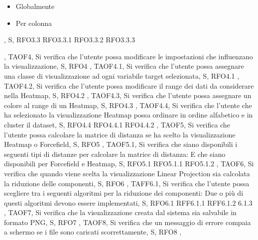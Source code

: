 {{{\begin{itemize}
                \item Globalmente
                \item Per colonna
            \end{itemize}},
            S,
            RFO3.3 RFO3.3.1 RFO3.3.2 RFO3.3.3
        },
        {   
            TAOF4,
            Si verifica che l'utente possa modificare le impostazioni che influenzano la visualizzazione,
            S,
            RFO4
        },
        {   
            TAOF4.1,
            Si verifica che l'utente possa assegnare una classe di visualizzazione ad ogni variabile target selezionata,
            S,
            RFO4.1
        },
        {   
            TAOF4.2,
            Si verifica che l'utente possa modificare il range dei dati da considerare nella Heatmap,
            S,
            RFO4.2
        },
        {   
            TAOF4.3,
            Si verifica che l'utente possa assegnare un colore al range di un Heatmap,
            S,
            RFO4.3
        },
        {   
            TAOF4.4,
            Si verifica che l'utente che ha selezionato la visualizzazione Heatmap possa ordinare in ordine alfabetico e in cluster il dataset,
            S,
            RFO4.4 RFO4.4.1 RFO4.4.2
        },
        {   
            TAOF5,
            Si verifica che l'utente possa calcolare la matrice di distanza se ha scelto la visualizzazione Heatmap o Forcefield,
            S,
            RFO5
        },    
        {   
            TAOF5.1,
            Si verifica che siano disponibili i seguenti tipi di distanze per calcolare la matrice di distanza:
            E che siano disponibili per Forcefield e Heatmap,
            S,
            RFO5.1 RFO5.1.1 RFO5.1.2
        },
        {   
            TAOF6,
            Si verifica che quando viene scelta la visualizzazione Linear Projection sia calcolata la riduzione delle componenti,
            S,
            RFO6
        },
        {   
            TAFF6.1,
            Si verifica che l'utente possa scegliere tra i seguenti algoritmi per la riduzione dei componenti:
            Due o più di questi algoritmi devono essere implementati,
            S,
            RFO6.1 RFF6.1.1 RFF6.1.2 6.1.3
        },
        {   
            TAOF7,
            Si verifica che la visualizzazione creata dal sistema sia salvabile in formato PNG,
            S,
            RFO7
        },
        {   
            TAOF8,
            Si verifica che un messaggio di errore compaia a schermo se i file sono caricati scorrettamente,
            S,
            RFO8
        },
        }
        
